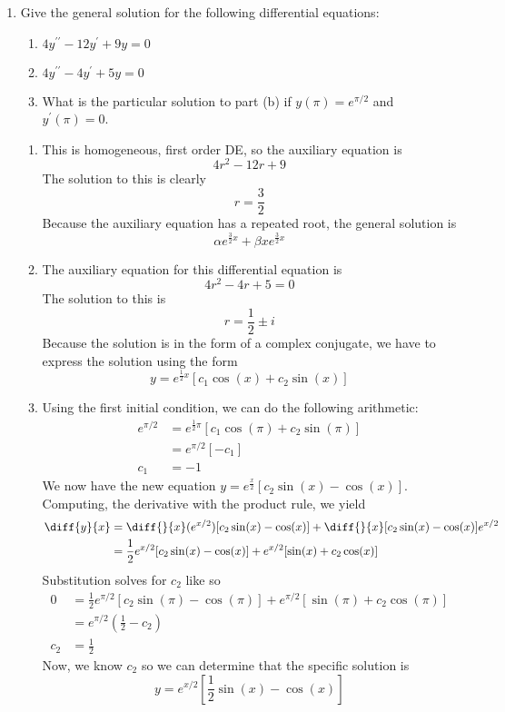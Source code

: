 \documentclass{article}
\begin{document}
\begin{enumerate}[label=\textbf{(3.\arabic*)}]

\item Give the general solution for the following differential equations:
\begin{enumerate}
\item $4y^{\prime\prime}-12y^\prime+9y=0$
\item $4y^{\prime\prime}-4y^\prime+5y=0$
\item What is the particular solution to part (b) if $y(\pi)=e^{\pi/2}$ and $y^\prime (\pi)=0$.
\end{enumerate}

\begin{enumerate}
\item This is homogeneous, first order DE, so the auxiliary equation is 
\[4r^2-12r+9\]
The solution to this is clearly 
\[r=\frac{3}{2}\]
Because the auxiliary equation has a repeated root, the general solution is 
\[\alpha e^{\frac{3}{2}x}+\beta xe^{\frac{3}{2}x}\]

\item The auxiliary equation for this differential equation is
\[4r^2-4r+5=0\]
The solution to this is	
\[r=\frac{1}{2}\pm i\]
Because the solution is in the form of a complex conjugate, we have to express the solution using the form 
\[y = e^{\frac{1}{2}x}[c_1\cos(x)+c_2\sin(x)]\]

\item Using the first initial condition, we can do the following arithmetic:
\begin{align*}
e^{\pi/2} &= e^{\frac{1}{2}\pi}[c_1\cos(\pi)+c_2\sin(\pi)]\\
&= e^{\pi/2}[-c_1]\\
c_1 &= -1
\end{align*}
We now have the new equation $y = e^{\frac{x}{2}}[c_2\sin(x)-\cos(x)]$. Computing, the derivative with the product rule, we yield
\begin{align*}
\diff{y}{x}&=\diff{}{x}(e^{x/2})[c_2\sin(x)-\cos(x)]+\diff{}{x}[c_2\sin(x)-\cos(x)]e^{x/2}\\
&=\frac{1}{2}e^{x/2}[c_2\sin(x)-\cos(x)]+e^{x/2}[\sin(x)+c_2\cos(x)]
\end{align*}
Substitution solves for $c_2$ like so 
\begin{align*}
0&= \frac{1}{2}e^{\pi/2}[c_2\sin(\pi)-\cos(\pi)]+e^{\pi/2}[\sin(\pi)+c_2\cos(\pi)]\\
&= e^{\pi/2}(\frac{1}{2}-c_2)\\
c_2 &= \frac{1}{2}
\end{align*}
Now, we know $c_2$ so we can determine that the specific solution is
\[y = e^{x/2}[\frac{1}{2}\sin(x)-\cos(x)]\]
\end{enumerate}


\end{enumerate}
\end{document}
